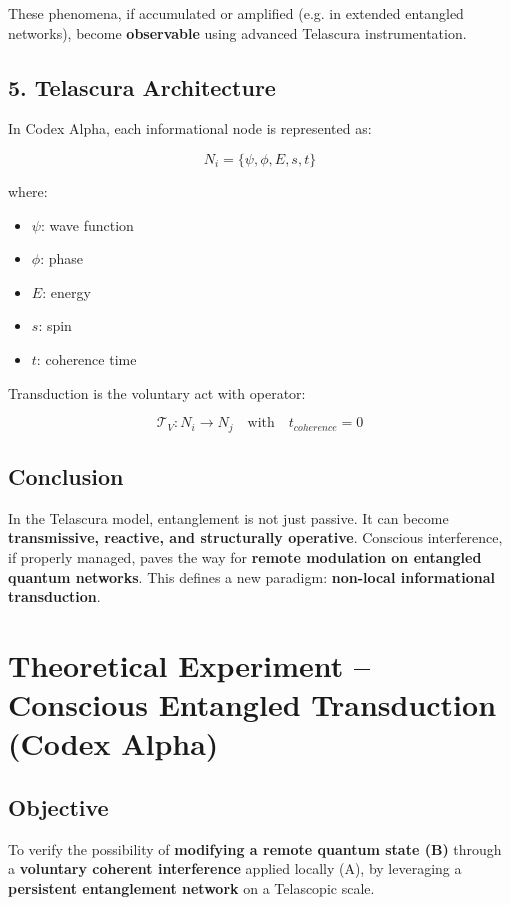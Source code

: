 \documentclass[12pt]{article}
\begin{document}
These phenomena, if accumulated or amplified (e.g. in extended entangled networks), become \textbf{observable} using advanced Telascura instrumentation.

\subsection*{5. Telascura Architecture}

In Codex Alpha, each informational node is represented as:

\[
N_i = \{\psi, \phi, E, s, t\}
\]

where:
\begin{itemize}
    \item $\psi$: wave function
    \item $\phi$: phase
    \item $E$: energy
    \item $s$: spin
    \item $t$: coherence time
\end{itemize}

Transduction is the voluntary act with operator:

\[
\mathcal{T}_V: N_i \rightarrow N_j \quad \text{with} \quad t_{coherence} = 0
\]

\subsection*{Conclusion}

In the Telascura model, entanglement is not just passive. It can become \textbf{transmissive, reactive, and structurally operative}. Conscious interference, if properly managed, paves the way for \textbf{remote modulation on entangled quantum networks}. This defines a new paradigm: \textbf{non-local informational transduction}.
\section*{Theoretical Experiment – Conscious Entangled Transduction (Codex Alpha)}

\subsection*{Objective}

To verify the possibility of \textbf{modifying a remote quantum state (B)} through a \textbf{voluntary coherent interference} applied locally (A), by leveraging a \textbf{persistent entanglement network} on a Telascopic scale.
\end{document}
